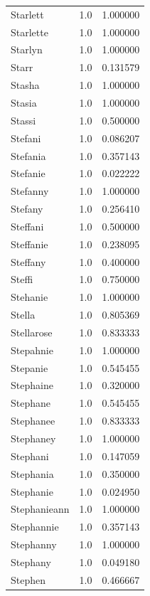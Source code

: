 \documentclass[
  letterpaper,
  DIV=11,
  numbers=noendperiod]{scrreprt}
\begin{document}
\begin{tabular}{lrr}
Starlett        &   1.0 &   1.000000 \\
Starlette       &   1.0 &   1.000000 \\
Starlyn         &   1.0 &   1.000000 \\
Starr           &   1.0 &   0.131579 \\
Stasha          &   1.0 &   1.000000 \\
Stasia          &   1.0 &   1.000000 \\
Stassi          &   1.0 &   0.500000 \\
Stefani         &   1.0 &   0.086207 \\
Stefania        &   1.0 &   0.357143 \\
Stefanie        &   1.0 &   0.022222 \\
Stefanny        &   1.0 &   1.000000 \\
Stefany         &   1.0 &   0.256410 \\
Steffani        &   1.0 &   0.500000 \\
Steffanie       &   1.0 &   0.238095 \\
Steffany        &   1.0 &   0.400000 \\
Steffi          &   1.0 &   0.750000 \\
Stehanie        &   1.0 &   1.000000 \\
Stella          &   1.0 &   0.805369 \\
Stellarose      &   1.0 &   0.833333 \\
Stepahnie       &   1.0 &   1.000000 \\
Stepanie        &   1.0 &   0.545455 \\
Stephaine       &   1.0 &   0.320000 \\
Stephane        &   1.0 &   0.545455 \\
Stephanee       &   1.0 &   0.833333 \\
Stephaney       &   1.0 &   1.000000 \\
Stephani        &   1.0 &   0.147059 \\
Stephania       &   1.0 &   0.350000 \\
Stephanie       &   1.0 &   0.024950 \\
Stephanieann    &   1.0 &   1.000000 \\
Stephannie      &   1.0 &   0.357143 \\
Stephanny       &   1.0 &   1.000000 \\
Stephany        &   1.0 &   0.049180 \\
Stephen         &   1.0 &   0.466667 \\

\end{tabular}
\end{document}
